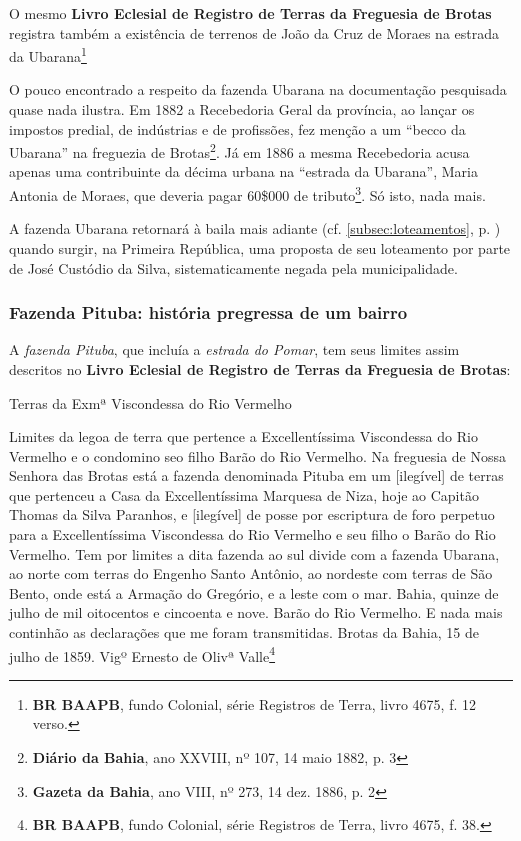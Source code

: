 O mesmo \textbf{Livro Eclesial de Registro de Terras da Freguesia de Brotas} registra também a existência de terrenos de João da Cruz de Moraes na estrada da Ubarana\footnote{\textbf{BR BAAPB}, fundo Colonial, série Registros de Terra, livro 4675, f. 12 verso.}

O pouco encontrado a respeito da fazenda Ubarana na documentação pesquisada quase nada ilustra. Em 1882 a Recebedoria Geral da província, ao lançar os impostos predial, de indústrias e de profissões, fez menção a um ``becco da Ubarana'' na freguezia de Brotas\footnote{\textbf{Diário da Bahia}, ano XXVIII, nº 107, 14 maio 1882, p. 3}. Já em 1886 a mesma Recebedoria acusa apenas uma contribuinte da décima urbana na ``estrada da Ubarana'', Maria Antonia de Moraes, que deveria pagar 60\$000 de tributo\footnote{\textbf{Gazeta da Bahia}, ano VIII, nº 273, 14 dez. 1886, p. 2}. Só isto, nada mais.

A fazenda Ubarana retornará à baila mais adiante (cf. \autoref{subsec:loteamentos}, p. \pageref{subsec:loteamentos}) quando surgir, na Primeira República, uma proposta de seu loteamento por parte de José Custódio da Silva, sistematicamente negada pela municipalidade.

\subsubsection{Fazenda Pituba: história pregressa de um bairro}

A \textit{fazenda Pituba}, que incluía a \textit{estrada do Pomar}, tem seus limites assim descritos no \textbf{Livro Eclesial de Registro de Terras da Freguesia de Brotas}:

\begin{citacao}
Terras da Exmª Viscondessa do Rio Vermelho

Limites da legoa de terra que pertence a Excellentíssima Viscondessa do Rio Vermelho e o condomino seo filho Barão do Rio Vermelho. Na freguesia de Nossa Senhora das Brotas está a fazenda denominada Pituba em um [ilegível] de terras que pertenceu a Casa da Excellentíssima Marquesa de Niza, hoje ao Capitão Thomas da Silva Paranhos, e [ilegível] de posse por escriptura de foro perpetuo para a Excellentíssima Viscondessa do Rio Vermelho e seu filho o Barão do Rio Vermelho. Tem por limites a dita fazenda ao sul divide com a fazenda Ubarana, ao norte com terras do Engenho Santo Antônio, ao nordeste com terras de São Bento, onde está a Armação do Gregório, e a leste com o mar. Bahia, quinze de julho de mil oitocentos e cincoenta e nove. Barão do Rio Vermelho. E nada mais continhão as declarações que me foram transmitidas. Brotas da Bahia, 15 de julho de 1859. Vigº Ernesto de Olivª Valle\footnote{\textbf{BR BAAPB}, fundo Colonial, série Registros de Terra, livro 4675, f. 38.}
\end{citacao}

